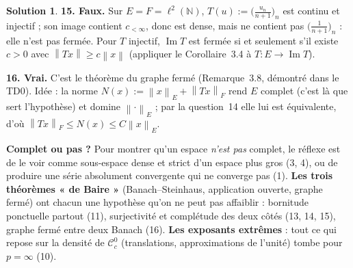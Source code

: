 \documentclass[11pt,a4paper]{article}
\newcommand{\N}{\mathbb{N}}
\newcommand{\norm}[1]{\left\|#1\right\|}
\newcommand{\Cc}{\mathcal{C}^0_c}
\DeclareMathOperator{\Ima}{Im}
\theoremstyle{definition}
\newtheorem*{solution}{Solution}
\begin{document}
\begin{solution}
\medskip
\noindent\textbf{15. Faux.} Sur $E=F=\ell^2(\N)$, $T(u):=\big(\frac{u_n}{n+1}\big)_n$ est continu et injectif ; son image contient $c_{<\infty}$, donc est dense, mais ne contient pas $\big(\frac1{n+1}\big)_n$ : elle n'est pas fermée. Pour $T$ injectif, $\Ima T$ est fermée si et seulement s'il existe $c>0$ avec $\norm{Tx}\ge c\norm x$ (appliquer le Corollaire~3.4 à $T:E\to\Ima T$).

\medskip
\noindent\textbf{16. Vrai.} C'est le théorème du graphe fermé (Remarque~3.8, démontré dans le TD0). Idée : la norme $N(x):=\norm x_E+\norm{Tx}_F$ rend $E$ complet (c'est là que sert l'hypothèse) et domine $\norm\cdot_E$ ; par la question~14 elle lui est équivalente, d'où $\norm{Tx}_F\le N(x)\le C\norm x_E$.
\end{solution}

\begin{methode}
\textbf{Complet ou pas ?} Pour montrer qu'un espace \emph{n'est pas} complet, le réflexe est de le voir comme sous-espace dense et strict d'un espace plus gros (3, 4), ou de produire une série absolument convergente qui ne converge pas (1). \textbf{Les trois théorèmes « de Baire »} (Banach--Steinhaus, application ouverte, graphe fermé) ont chacun une hypothèse qu'on ne peut pas affaiblir : bornitude ponctuelle partout (11), surjectivité et complétude des deux côtés (13, 14, 15), graphe fermé entre deux Banach (16). \textbf{Les exposants extrêmes} : tout ce qui repose sur la densité de $\Cc$ (translations, approximations de l'unité) tombe pour $p=\infty$ (10).
\end{methode}
\end{document}
